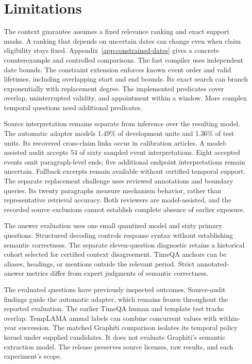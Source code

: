 \section*{Limitations}
The context guarantee assumes a fixed relevance ranking and exact support masks.
A ranking that depends on uncertain dates can change even when claim eligibility stays fixed.
Appendix~\ref{app:constrained-dates} gives a concrete counterexample and controlled comparisons.
The fast compiler uses independent date bounds.
The constraint extension enforces known event order and valid lifetimes, including overlapping start and end bounds.
Its exact search can branch exponentially with replacement degree.
The implemented predicates cover overlap, uninterrupted validity, and appointment within a window.
More complex temporal questions need additional predicates.

Source interpretation remains separate from inference over the resulting model.
The automatic adapter models 1.49\% of development units and 1.36\% of test units.
Its recovered cross-claim links occur in calibration articles.
A model-assisted audit accepts 54 of sixty sampled event interpretations.
Eight accepted events omit paragraph-level ends; five additional endpoint interpretations remain uncertain.
Fallback excerpts remain available without certified temporal support.
The separate replacement challenge uses reviewed annotations and boundary queries.
Its twenty paragraphs measure mechanism behavior, rather than representative retrieval accuracy.
Both reviewers are model-assisted, and the recorded source exclusions cannot establish complete absence of earlier exposure.

The answer evaluation uses one small quantized model and sixty primary questions.
Structured decoding controls response syntax without establishing semantic correctness.
The separate eleven-question diagnostic retains a historical cohort selected for certified context disagreement.
TimeQA anchors can be aliases, headings, or mentions outside the relevant period.
Strict annotated-answer metrics differ from expert judgments of semantic correctness.

The evaluated questions have previously inspected outcomes.
Source-audit findings guide the automatic adapter, which remains frozen throughout the reported evaluation.
The earlier TimeQA human and template test tracks overlap.
TempLAMA annual labels can combine concurrent values with within-year succession.
The matched Graphiti comparison isolates its temporal policy kernel under supplied candidates.
It does not evaluate Graphiti's semantic extraction model.
The release preserves source licenses, raw results, and each experiment's scope.
